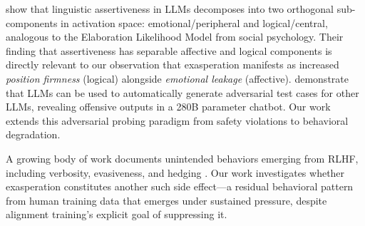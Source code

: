 \citet{tsujimura2025assertiveness} show that linguistic assertiveness in LLMs decomposes into two orthogonal sub-components in activation space: emotional/peripheral and logical/central, analogous to the Elaboration Likelihood Model from social psychology. Their finding that assertiveness has separable affective and logical components is directly relevant to our observation that exasperation manifests as increased \emph{position firmness} (logical) alongside \emph{emotional leakage} (affective). \citet{perez2022red} demonstrate that LLMs can be used to automatically generate adversarial test cases for other LLMs, revealing offensive outputs in a 280B parameter chatbot. Our work extends this adversarial probing paradigm from safety violations to behavioral degradation.

A growing body of work documents unintended behaviors emerging from RLHF, including verbosity, evasiveness, and hedging \citep{alignment_ceiling2023}. Our work investigates whether exasperation constitutes another such side effect---a residual behavioral pattern from human training data that emerges under sustained pressure, despite alignment training's explicit goal of suppressing it.
